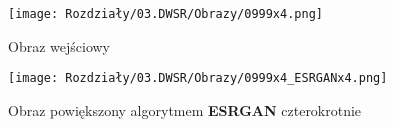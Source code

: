 \begin{figure}[ht]
    \centering
    \begin{minipage}[t]{0.45\linewidth}
        \texttt{[image: Rozdziały/03.DWSR/Obrazy/0999x4.png]}
        \caption{Obraz wejściowy \cite{guo2017deep}}
        \label{fig:image71}
    \end{minipage}
    \hspace{0.5cm}
    \begin{minipage}[t]{0.45\linewidth}
        \texttt{[image: Rozdziały/03.DWSR/Obrazy/0999x4\_ESRGANx4.png]}
        \caption{Obraz powiększony algorytmem \textbf{ESRGAN} czterokrotnie}
        \label{fig:image72}
    \end{minipage}
\end{figure}